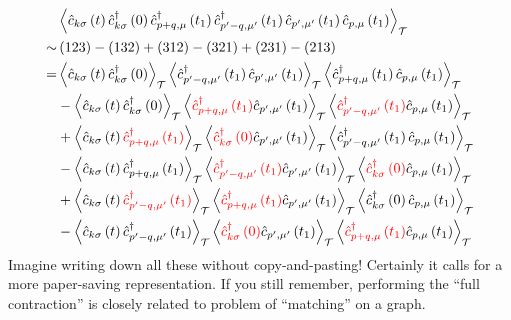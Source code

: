 \begin{align*}
    &\left< \hat{c}_{k\sigma}\left( t \right) \hat{c}_{k\sigma}^{\dagger}\left( 0 \right) \hat{c}_{p+q,\mu}^{\dagger}\left( t_1 \right) \hat{c}_{p'-q,\mu '}^{\dagger}\left( t_1 \right) \hat{c}_{p',\mu '}\left( t_1 \right) \hat{c}_{p,\mu}\left( t_1 \right) \right> _{\mathcal{T}}\\
    \sim& \left( 123 \right) -\left( 132 \right) +\left( 312 \right) -\left( 321 \right) +\left( 231 \right) -\left( 213 \right) \\
    =&\left< \hat{c}_{k\sigma}\left( t \right) \hat{c}_{k\sigma}^{\dagger}\left( 0 \right) \right> _{\mathcal{T}}\left< \hat{c}_{p'-q,\mu '}^{\dagger}\left( t_1 \right) \hat{c}_{p',\mu '}\left( t_1 \right) \right> _{\mathcal{T}}\left< \hat{c}_{p+q,\mu}^{\dagger}\left( t_1 \right) \hat{c}_{p,\mu}\left( t_1 \right) \right> _{\mathcal{T}}\\
    &-\left< \hat{c}_{k\sigma}\left( t \right) \hat{c}_{k\sigma}^{\dagger}\left( 0 \right) \right> _{\mathcal{T}}\left< {\color{red} \hat{c}_{p+q,\mu}^{\dagger}\left( t_1 \right) }\hat{c}_{p',\mu '}\left( t_1 \right) \right> _{\mathcal{T}}\left< {\color{red} \hat{c}_{p'-q,\mu '}^{\dagger}\left( t_1 \right) }\hat{c}_{p,\mu}\left( t_1 \right) \right> _{\mathcal{T}}\\
    &+\left< \hat{c}_{k\sigma}\left( t \right) {\color{red} \hat{c}_{p+q,\mu}^{\dagger}\left( t_1 \right) } \right> _{\mathcal{T}}\left< {\color{red} \hat{c}_{k\sigma}^{\dagger}\left( 0 \right) }\hat{c}_{p',\mu '}\left( t_1 \right) \right> _{\mathcal{T}}\left< \hat{c}_{p'-q,\mu '}^{\dagger}\left( t_1 \right) \hat{c}_{p,\mu}\left( t_1 \right) \right> _{\mathcal{T}}\\
    &-\left< \hat{c}_{k\sigma}\left( t \right) \hat{c}_{p+q,\mu}^{\dagger}\left( t_1 \right) \right> _{\mathcal{T}}\left< {\color{red} \hat{c}_{p'-q,\mu '}^{\dagger}\left( t_1 \right) }\hat{c}_{p',\mu '}\left( t_1 \right) \right> _{\mathcal{T}}\left< {\color{red} \hat{c}_{k\sigma}^{\dagger}\left( 0 \right) }\hat{c}_{p,\mu}\left( t_1 \right) \right> _{\mathcal{T}}\\
    &+\left< \hat{c}_{k\sigma}\left( t \right) {\color{red} \hat{c}_{p'-q,\mu '}^{\dagger}\left( t_1 \right) } \right> _{\mathcal{T}}\left< {\color{red} \hat{c}_{p+q,\mu}^{\dagger}\left( t_1 \right) }\hat{c}_{p',\mu '}\left( t_1 \right) \right> _{\mathcal{T}}\left< \hat{c}_{k\sigma}^{\dagger}\left( 0 \right) \hat{c}_{p,\mu}\left( t_1 \right) \right> _{\mathcal{T}}\\
    &-\left< \hat{c}_{k\sigma}\left( t \right) \hat{c}_{p'-q,\mu '}^{\dagger}\left( t_1 \right) \right> _{\mathcal{T}}\left< {\color{red} \hat{c}_{k\sigma}^{\dagger}\left( 0 \right) }\hat{c}_{p',\mu '}\left( t_1 \right) \right> _{\mathcal{T}}\left< {\color{red} \hat{c}_{p+q,\mu}^{\dagger}\left( t_1 \right) }\hat{c}_{p,\mu}\left( t_1 \right) \right> _{\mathcal{T}}
\end{align*}
Imagine writing down all these without copy-and-pasting! Certainly it calls for a more paper-saving representation. If you still remember, performing the ``full contraction'' is closely related to problem of ``matching'' on a graph.

